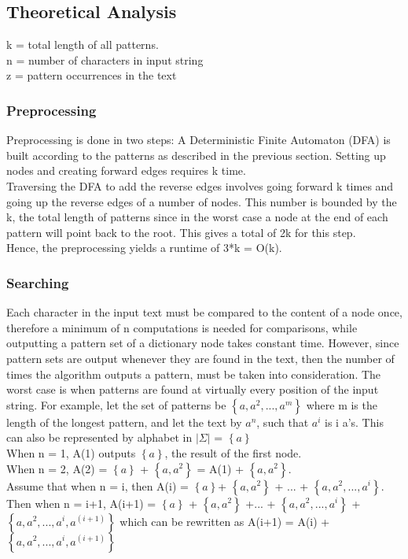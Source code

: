 \documentclass[paper=a4, fontsize=11pt]{scrartcl} %
\numberwithin{equation}{section} %
\numberwithin{figure}{section} %
\numberwithin{table}{section} %
\begin{document}
\subsection{Theoretical Analysis}
k = total length of all patterns.\\
n = number of characters in input string\\
z = pattern occurrences in the text\\

\subsubsection{Preprocessing}
Preprocessing is done in two steps:
A Deterministic Finite Automaton (DFA) is built according to the patterns as described in the previous section. Setting up nodes and creating forward edges requires k time.\\
Traversing the DFA to add the reverse edges involves going forward k times and going up the reverse edges of a number of nodes. This number is bounded by the k, the total length of patterns since in the worst case a node at the end of each pattern will point back to the root. This gives a total of 2k for this step. \\
Hence, the preprocessing yields a runtime of 3*k = O(k). 

\subsubsection{Searching}
Each character in the input text must be compared to the content of a node once, therefore a minimum of n computations is needed for comparisons, while outputting a pattern set of a dictionary node takes constant time. However, since pattern sets are output whenever they are found in the text, then the number of times the algorithm outputs a pattern, must be taken into consideration. The worst case is when patterns are found at virtually every position of the input string. For example, let the set of patterns be $\left\{a, a^2, ..., a^m\right\}$ where m is the length of the longest pattern, and let the text by $a^n$, such that $a^i$ is i a's. This can also be represented by alphabet in $|\Sigma|$ = $\left\{a\right\}$\\
 
When n = 1, A(1) outputs $\left\{a\right\}$, the result of the first node.\\
When n = 2, A(2) = $\left\{a\right\}$ + $\left\{a, a^2\right\}$ = A(1) + $\left\{a, a^2\right\}$.\\
Assume that when n = i, then A(i) =  $\left\{a\right\}$+ $\left\{a, a^2\right\}$ + ... + $\left\{a, a^2, ..., a^i\right\}$.\\
Then when n = i+1, A(i+1) = $\left\{a\right\}$ + $\left\{a, a^2\right\}$ +... + $\left\{a, a^2, ..., a^i\right\}$ + $\left\{a, a^2, ..., a^i, a^(i+1)\right\}$ which can be rewritten as 
A(i+1) = A(i) + $\left\{a, a^2, ..., a^i, a^(i+1)\right\}$ \\
\end{document}
